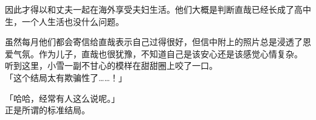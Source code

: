 因此才得以和丈夫一起在海外享受夫妇生活。他们大概是判断直哉已经长成了高中生，一个人生活也没什么问题。

虽然每月他们都会寄信给直哉表示自己过得很好，但信中附上的照片总是浸透了恩爱气氛。作为儿子，直哉也很犹豫，不知道自己是该安心还是该感觉心情复杂。\\

听到这里，小雪一副不甘心的模样在甜甜圈上咬了一口。\\

「这个结局太有欺骗性了……！」

「哈哈，经常有人这么说呢。」\\

正是所谓的标准结局。
